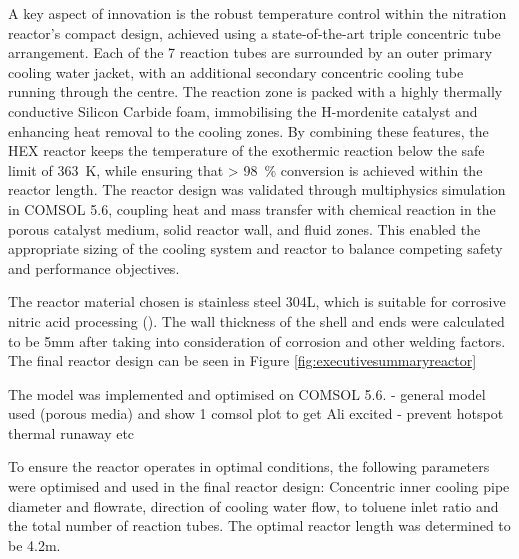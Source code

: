 A key aspect of innovation is the robust temperature control within the nitration reactor's compact design, achieved using a state-of-the-art triple concentric tube arrangement. Each of the 7 reaction tubes are surrounded by an outer primary cooling water jacket, with an additional secondary concentric cooling tube running through the centre. The reaction zone is packed with a highly thermally conductive Silicon Carbide foam, immobilising the H-mordenite catalyst and enhancing heat removal to the cooling zones. By combining these features, the HEX reactor keeps the temperature of the exothermic reaction below the safe limit of \SI{363}{\K}, while ensuring that \SI{> 98}{\percent} conversion is achieved within the reactor length. The reactor design was validated through multiphysics simulation in COMSOL 5.6, coupling heat and mass transfer with chemical reaction in the porous catalyst medium, solid reactor wall, and fluid zones. This enabled the appropriate sizing of the cooling system and reactor to balance competing safety and performance objectives.

The reactor material chosen is stainless steel 304L, which is suitable for corrosive nitric acid processing (). The wall thickness of the shell and ends were calculated to be 5mm after taking into consideration of corrosion and other welding factors. The final reactor design can be seen in Figure \ref{fig:executivesummaryreactor}


The model was implemented and optimised on COMSOL 5.6. 
- general model used (porous media) and show 1 comsol plot to get Ali excited
- prevent hotspot thermal runaway etc

To ensure the reactor operates in optimal conditions, the following parameters were optimised and used in the final reactor design: Concentric inner cooling pipe diameter and flowrate, direction of cooling water flow,  to toluene inlet ratio and the total number of reaction tubes. %
The optimal reactor length was determined to be 4.2m. 


